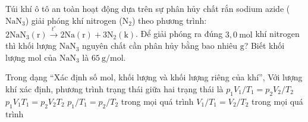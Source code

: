 \begin{ex}
Túi khí ô tô an toàn hoạt động dựa trên sự phân hủy chất rắn sodium azide ($\mathrm{NaN_3}$) giải phóng khí nitrogen ($\mathrm{N_2}$) theo phương trình: $2\mathrm{NaN_3(r)} \xrightarrow{t^\circ} 2\mathrm{Na(r)} + 3\mathrm{N_2(k)}$. Để giải phóng ra đúng $3,0\ \mathrm{mol}$ khí nitrogen thì khối lượng $\mathrm{NaN_3}$ nguyên chất cần phân hủy bằng bao nhiêu $\mathrm{g}$? Biết khối lượng mol của $\mathrm{NaN_3}$ là $65\ \mathrm{g/mol}$.
\end{ex}

\begin{ex}
Trong dạng “Xác định số mol, khối lượng và khối lượng riêng của khí”, Với lượng khí xác định, phương trình trạng thái giữa hai trạng thái là
\choice
{\True $p_1V_1/T_1=p_2V_2/T_2$}
{$p_1V_1T_1=p_2V_2T_2$}
{$p_1/T_1=p_2/T_2$ trong mọi quá trình}
{$V_1/T_1=V_2/T_2$ trong mọi quá trình}
\end{ex}

